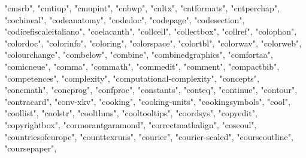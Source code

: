 \documentclass[
]{article}
\newenvironment{Shaded}{\begin{snugshade}}{\end{snugshade}}
\newcommand{\NormalTok}[1]{#1}
\newcommand{\StringTok}[1]{\textcolor[rgb]{0.31,0.60,0.02}{#1}}
\begin{document}
\begin{Shaded}
\begin{Highlighting}[]
\StringTok{"cmsrb"}\NormalTok{, }\StringTok{"cmtiup"}\NormalTok{, }\StringTok{"cmupint"}\NormalTok{, }\StringTok{"cnbwp"}\NormalTok{, }\StringTok{"cnltx"}\NormalTok{, }\StringTok{"cntformats"}\NormalTok{, }
\StringTok{"cntperchap"}\NormalTok{, }\StringTok{"cochineal"}\NormalTok{, }\StringTok{"codeanatomy"}\NormalTok{, }\StringTok{"codedoc"}\NormalTok{, }\StringTok{"codepage"}\NormalTok{, }
\StringTok{"codesection"}\NormalTok{, }\StringTok{"codicefiscaleitaliano"}\NormalTok{, }\StringTok{"coelacanth"}\NormalTok{, }\StringTok{"collcell"}\NormalTok{, }
\StringTok{"collectbox"}\NormalTok{, }\StringTok{"collref"}\NormalTok{, }\StringTok{"colophon"}\NormalTok{, }\StringTok{"colordoc"}\NormalTok{, }\StringTok{"colorinfo"}\NormalTok{, }
\StringTok{"coloring"}\NormalTok{, }\StringTok{"colorspace"}\NormalTok{, }\StringTok{"colortbl"}\NormalTok{, }\StringTok{"colorwav"}\NormalTok{, }\StringTok{"colorweb"}\NormalTok{, }
\StringTok{"colourchange"}\NormalTok{, }\StringTok{"combelow"}\NormalTok{, }\StringTok{"combine"}\NormalTok{, }\StringTok{"combinedgraphics"}\NormalTok{, }\StringTok{"comfortaa"}\NormalTok{, }
\StringTok{"comicneue"}\NormalTok{, }\StringTok{"comma"}\NormalTok{, }\StringTok{"commath"}\NormalTok{, }\StringTok{"commedit"}\NormalTok{, }\StringTok{"comment"}\NormalTok{, }\StringTok{"compactbib"}\NormalTok{, }
\StringTok{"competences"}\NormalTok{, }\StringTok{"complexity"}\NormalTok{, }\StringTok{"computational{-}complexity"}\NormalTok{, }\StringTok{"concepts"}\NormalTok{, }
\StringTok{"concmath"}\NormalTok{, }\StringTok{"concprog"}\NormalTok{, }\StringTok{"confproc"}\NormalTok{, }\StringTok{"constants"}\NormalTok{, }\StringTok{"conteq"}\NormalTok{, }\StringTok{"continue"}\NormalTok{, }
\StringTok{"contour"}\NormalTok{, }\StringTok{"contracard"}\NormalTok{, }\StringTok{"conv{-}xkv"}\NormalTok{, }\StringTok{"cooking"}\NormalTok{, }\StringTok{"cooking{-}units"}\NormalTok{, }
\StringTok{"cookingsymbols"}\NormalTok{, }\StringTok{"cool"}\NormalTok{, }\StringTok{"coollist"}\NormalTok{, }\StringTok{"coolstr"}\NormalTok{, }\StringTok{"coolthms"}\NormalTok{, }
\StringTok{"cooltooltips"}\NormalTok{, }\StringTok{"coordsys"}\NormalTok{, }\StringTok{"copyedit"}\NormalTok{, }\StringTok{"copyrightbox"}\NormalTok{, }\StringTok{"cormorantgaramond"}\NormalTok{, }
\StringTok{"correctmathalign"}\NormalTok{, }\StringTok{"coseoul"}\NormalTok{, }\StringTok{"countriesofeurope"}\NormalTok{, }\StringTok{"counttexruns"}\NormalTok{, }
\StringTok{"courier"}\NormalTok{, }\StringTok{"courier{-}scaled"}\NormalTok{, }\StringTok{"courseoutline"}\NormalTok{, }\StringTok{"coursepaper"}\NormalTok{, }

\end{Highlighting}
\end{Shaded}
\end{document}
